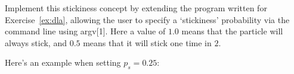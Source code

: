 \begin{exercise}
Implement this stickiness concept by extending the program written for Exercise~\ref{ex:dla}, allowing the user to specify a `stickiness' probability via the command line using argv[1]. Here a value of $1.0$ means that the particle will always stick, and $0.5$ means that it will stick one time in $2$.
\end{exercise}
\noindent Here's an example when setting $p_s=0.25$:
\begin{center}
\end{center}
